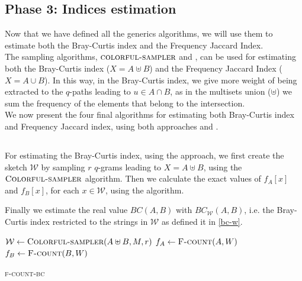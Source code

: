 \clearpage

\subsection*{Phase 3: Indices estimation}

Now that we have defined all the generics algorithms, 
we will use them to estimate both the Bray-Curtis index and the Frequency Jaccard Index.\\

The sampling algorithms, $\textsc{colorful-sampler}$ and \fsamp, can be used for estimating both the Bray-Curtis index ($X = A \uplus B$) and
the Frequency Jaccard Index ($X = A \cup B$).
In this way, in the Bray-Curtis index, we give more weight of being extracted to the $q$-paths leading to $u \in A \cap B$,
as in the multisets union ($\uplus$) we sum the frequency of the elements that belong to the intersection.\\

We now present the four final algorithms for estimating both Bray-Curtis index and Frequency Jaccard index, using both approaches
\fcount and \fsamp.

\subsection*{\fcount}

For estimating the Bray-Curtis index, using the \fcount approach, we first create the sketch $\mathcal{W}$ by sampling $r$ $q$-grams leading to $X = A \uplus B$,
using the $\textsc{Colorful-sampler}$ algorithm. Then we calculate the exact values of $f_{A}[x]$ and $f_{B}[x]$, for each $x \in \mathcal{W}$,
using the \fcount algorithm.

Finally we estimate the real value $BC(A,B)$ with $BC_{ \mathcal{W} }(A,B)$, i.e. the Bray-Curtis index restricted to the strings in $\mathcal{W}$ as defined it in \eqref{bc-w}.

\begin{algorithm}[h]
	\small
	\DontPrintSemicolon
	\BlankLine
	$\mathcal{W} \gets \textsc{Colorful-sampler}(A \uplus B, M, r)$ \;
	$f_{A} \gets \textsc{F-count}(A, W)$ \;
	$f_{B} \gets \textsc{F-count}(B, W)$ \;
	\BlankLine
	\caption{\textsc{f-count-bc}}
	\label{alg:randomsample}
	\label{alg:sample}
\end{algorithm}

